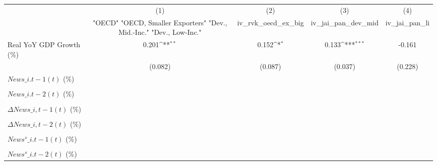 {
\def\sym#1{\ifmmode^{#1}\else\(^{#1}\)\fi}
\begin{tabular}{l*{4}{c}}
\toprule
                    &\multicolumn{1}{c}{(1)}&\multicolumn{1}{c}{(2)}&\multicolumn{1}{c}{(3)}&\multicolumn{1}{c}{(4)}\\
                    &\multicolumn{1}{c}{ "OECD" "OECD, Smaller Exporters" "Dev., Mid.-Inc." "Dev., Low-Inc."}&\multicolumn{1}{c}{iv\_rvk\_oecd\_ex\_big}&\multicolumn{1}{c}{iv\_jai\_pan\_dev\_mid}&\multicolumn{1}{c}{iv\_jai\_pan\_li}\\
\midrule
Real YoY GDP Growth (\%)&       0.201\sym{**} &       0.152\sym{*}  &       0.133\sym{***}&      -0.161         \\
                    &     (0.082)         &     (0.087)         &     (0.037)         &     (0.228)         \\
\addlinespace
$ News\_{i.t-1}(t)$ (\%)&                     &                     &                     &                     \\
                    &                     &                     &                     &                     \\
\addlinespace
$ News\_{i.t-2}(t)$ (\%)&                     &                     &                     &                     \\
                    &                     &                     &                     &                     \\
\addlinespace
$ \Delta News\_{i,t-1}(t)$ (\%)&                     &                     &                     &                     \\
                    &                     &                     &                     &                     \\
\addlinespace
$ \Delta News\_{i,t-2}(t)$ (\%)&                     &                     &                     &                     \\
                    &                     &                     &                     &                     \\
\addlinespace
$ News^s\_{i.t-1}(t)$ (\%)&                     &                     &                     &                     \\
                    &                     &                     &                     &                     \\
\addlinespace
$ News^s\_{i.t-2}(t)$ (\%)&                     &                     &                     &                     \\

\end{tabular}}
